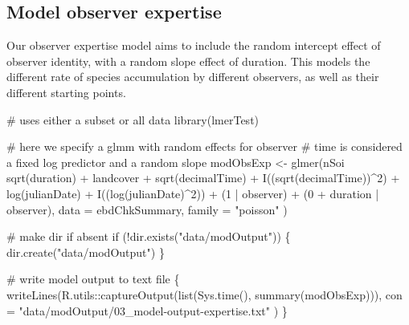 \documentclass[]{article}
\newenvironment{Shaded}{}{}
\newcommand{\CommentTok}[1]{\textcolor[rgb]{0.00,0.50,0.00}{#1}}
\newcommand{\ControlFlowTok}[1]{\textcolor[rgb]{0.00,0.00,1.00}{#1}}
\newcommand{\DataTypeTok}[1]{#1}
\newcommand{\DecValTok}[1]{#1}
\newcommand{\KeywordTok}[1]{\textcolor[rgb]{0.00,0.00,1.00}{#1}}
\newcommand{\NormalTok}[1]{#1}
\newcommand{\OperatorTok}[1]{#1}
\newcommand{\StringTok}[1]{\textcolor[rgb]{0.00,0.50,0.50}{#1}}
\begin{document}
\hypertarget{model-observer-expertise}{%
\subsection{Model observer expertise}\label{model-observer-expertise}}

Our observer expertise model aims to include the random intercept effect of observer identity, with a random slope effect of duration. This models the different rate of species accumulation by different observers, as well as their different starting points.

\begin{Shaded}
\begin{Highlighting}[numbers=left,,]
\CommentTok{# uses either a subset or all data}
\KeywordTok{library}\NormalTok{(lmerTest)}

\CommentTok{# here we specify a glmm with random effects for observer}
\CommentTok{# time is considered a fixed log predictor and a random slope}
\NormalTok{modObsExp <-}\StringTok{ }\KeywordTok{glmer}\NormalTok{(nSoi }\OperatorTok{~}\StringTok{ }\KeywordTok{sqrt}\NormalTok{(duration) }\OperatorTok{+}
\StringTok{  }\NormalTok{landcover }\OperatorTok{+}
\StringTok{  }\KeywordTok{sqrt}\NormalTok{(decimalTime) }\OperatorTok{+}
\StringTok{  }\KeywordTok{I}\NormalTok{((}\KeywordTok{sqrt}\NormalTok{(decimalTime))}\OperatorTok{^}\DecValTok{2}\NormalTok{) }\OperatorTok{+}
\StringTok{  }\KeywordTok{log}\NormalTok{(julianDate) }\OperatorTok{+}
\StringTok{  }\KeywordTok{I}\NormalTok{((}\KeywordTok{log}\NormalTok{(julianDate)}\OperatorTok{^}\DecValTok{2}\NormalTok{)) }\OperatorTok{+}
\StringTok{  }\NormalTok{(}\DecValTok{1} \OperatorTok{|}\StringTok{ }\NormalTok{observer) }\OperatorTok{+}\StringTok{ }\NormalTok{(}\DecValTok{0} \OperatorTok{+}\StringTok{ }\NormalTok{duration }\OperatorTok{|}\StringTok{ }\NormalTok{observer),}
\DataTypeTok{data =}\NormalTok{ ebdChkSummary, }\DataTypeTok{family =} \StringTok{"poisson"}
\NormalTok{)}
\end{Highlighting}
\end{Shaded}

\begin{Shaded}
\begin{Highlighting}[numbers=left,,]
\CommentTok{# make dir if absent}
\ControlFlowTok{if}\NormalTok{ (}\OperatorTok{!}\KeywordTok{dir.exists}\NormalTok{(}\StringTok{"data/modOutput"}\NormalTok{)) \{}
  \KeywordTok{dir.create}\NormalTok{(}\StringTok{"data/modOutput"}\NormalTok{)}
\NormalTok{\}}

\CommentTok{# write model output to text file}
\NormalTok{\{}
  \KeywordTok{writeLines}\NormalTok{(R.utils}\OperatorTok{::}\KeywordTok{captureOutput}\NormalTok{(}\KeywordTok{list}\NormalTok{(}\KeywordTok{Sys.time}\NormalTok{(), }\KeywordTok{summary}\NormalTok{(modObsExp))),}
    \DataTypeTok{con =} \StringTok{"data/modOutput/03_model-output-expertise.txt"}
\NormalTok{  )}
\NormalTok{\}}
\end{Highlighting}
\end{Shaded}
\end{document}
